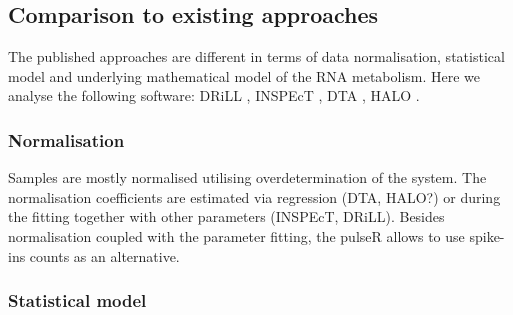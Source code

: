 \subsection{Comparison to existing approaches}
The published approaches are different in terms of 
data normalisation, statistical model and underlying mathematical model of the 
RNA metabolism. Here we analyse the following software:
DRiLL \citep{rabani2014high},
INSPEcT \citep{de2015inspect},
DTA \citep{schwalb2012measurement},
HALO \citep{friedel2010halo}.
\subsubsection*{Normalisation}
Samples are mostly normalised utilising overdetermination of the system.
The normalisation coefficients are estimated via regression
(DTA, HALO?) or during the fitting together 
with other parameters (INSPEcT, DRiLL). 
Besides normalisation coupled with the parameter fitting, 
the pulseR allows to use spike-ins counts as an alternative.

\subsubsection*{Statistical model}

